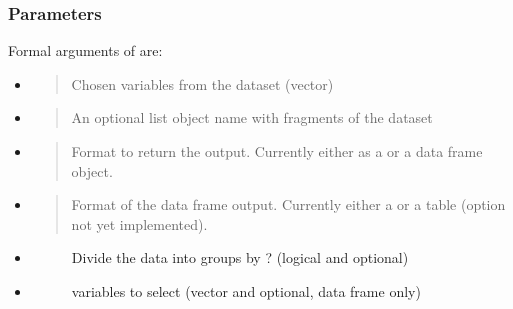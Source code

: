 \documentclass[a4paper,12pt,english]{sphinxhowto}
\begin{document}


\subsubsection{Parameters}
\label{\detokenize{EDHVariables:parameters}}
Formal arguments of  are:
\begin{itemize}
\item {} 
\begin{quote}

Chosen variables from the  dataset (vector)
\end{quote}

\item {} 
\begin{quote}

An optional list object name with fragments of the  dataset
\end{quote}

\item {} 
\begin{quote}

Format to return the output. Currently either as a  or a data frame  object.
\end{quote}

\item {} 
\begin{quote}

Format of the data frame output. Currently  either a  or a  table (option  not yet implemented).
\end{quote}

\item {} \begin{description}
\item[{}] \leavevmode
Divide the data into groups by ? (logical and optional)

\end{description}

\item {} \begin{description}
\item[{}] \leavevmode
{} variables to select (vector and optional, data frame   only)


\end{description}
\end{itemize}
\end{document}
